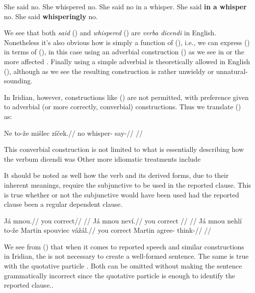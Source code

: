 \pex[*=?*]
\a She said no.
\a She whispered no.
\a She said no in a whisper.
\a {} She said \textbf{in a whisper} no.
\a {} She said \textbf{whisperingly} no.
\xe

\smallskip

We see that both \emph{said} () and \emph{whispered} () are \emph{verba dicendi} in English. Nonetheless it's also obvious how  is simply a function of (), i.e., we can express () in terms of (), in this case using an adverbial construction () as we see in  or the more affected . Finally using a simple adverbial is theoretically allowed in English (), although as we see the resulting construction is rather unwieldy or unnatural-sounding.

In Iridian, however, constructions like () are not permitted, with preference given to adverbial (or more correctly, converbial) constructions. Thus we translate () as:

\pex
\begingl
\gla Ne to-že mišlec zíček.//
\glb no  whisper- say-//
\glft {}//
\endgl
\xe


This converbial construction is not limited to what is essentially describing how the verbum dicendi was  Other more idiomatic treatments include


It should be noted as well how the verb  and its derived forms, due to their inherent meanings, require the subjunctive to be used in the reported clause. This is true whether or not the subjunctive would have been used had the reported clause been a regular dependent clause.


\pex
\a
\begingl
  \gla Já mnou.//
  \glb you correct//
  \glft {}//
\endgl
\a
\begingl
  \gla Já mnou neví.//
  \glb you correct //
  \glft {}//
\endgl
\a
\begingl
  \gla Já mnou nehlí to-že Martin spouviec vážál.//
  \glb you correct   Martin agree- think-//
  \glft {}//
\endgl
\xe



We see from () that when it comes to reported speech and similar constructions in Iridian, the  is not necessary to create a well-formed sentence. The same is true with the quotative particle . Both can be omitted without making the sentence grammatically incorrect since the quotative particle is enough to identify the reported clause..

